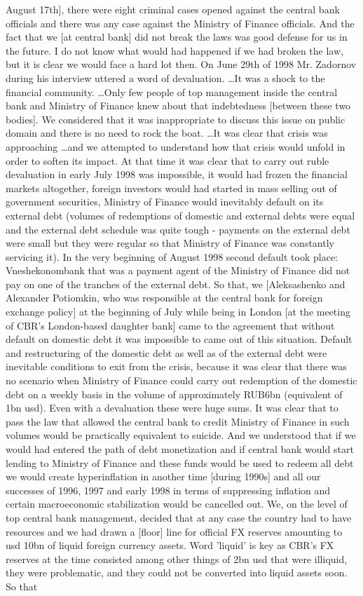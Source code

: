August 17th], there were eight criminal cases opened against the central bank officials and there was any case against the Ministry of Finance officials. And the fact that we [at central bank] did not break the laws was good defense for us in the future. I do not know what would had happened if we had broken the law, but it is clear we would face a hard lot then. On June 29th of 1998 Mr. Zadornov during his interview uttered a word of devaluation. \dots It was a shock to the financial community. \dots Only few people of top management inside the central bank and Ministry of Finance knew about that indebtedness [between these two bodies]. We considered that it was inappropriate to discuss this issue on public domain and there is no need to rock the boat. \dots It was clear that crisis was approaching \dots and we attempted to understand how that crisis would unfold in order to soften its impact. At that time it was clear that to carry out ruble devaluation in early July 1998 was impossible, it would had frozen the financial markets altogether, foreign investors would had started in mass selling out of government securities, Ministry of Finance would inevitably default on its external debt (volumes of redemptions of domestic and external debts were equal and the external debt schedule was quite tough - payments on the external debt were small but they were regular so that Ministry of Finance was constantly servicing it). In the very beginning of August 1998 second default took place: Vneshekonombank that was a payment agent of the Ministry of Finance did not pay on one of the tranches of the external debt. So that, we [Aleksashenko and Alexander Potiomkin, who was responsible at the central bank for foreign exchange policy] at the beginning of July while being in London [at the meeting of CBR's London-based daughter bank] came to the agreement that without default on domestic debt it was impossible to came out of this situation. Default and restructuring of the domestic debt as well as of the external debt were inevitable conditions to exit from the crisis, because it was clear that there was no scenario when Ministry of Finance could carry out redemption of the domestic debt on a weekly basis in the volume of approximately RUB6bn (equivalent of 1bn \ac{usd}). Even with a devaluation these were huge sums. It was clear that to pass the law that allowed the central bank to credit Ministry of Finance in such volumes would be practically equivalent to suicide. And we understood that if we would had entered the path of debt monetization and if central bank would start lending to Ministry of Finance and these funds would be used to redeem all debt we would create hyperinflation in another time [during 1990s] and all our successes of 1996, 1997 and early 1998 in terms of suppressing inflation and certain macroeconomic stabilization would be cancelled out. We, on the level of top central bank management, decided that at any case the country had to have resources and we had drawn a [floor] line for official FX reserves amounting to \ac{usd} 10bn of liquid foreign currency assets. Word 'liquid' is key as CBR's FX reserves at the time consisted among other things of 2bn \ac{usd} that were illiquid, they were problematic, and they could not be converted into liquid assets soon. So that 